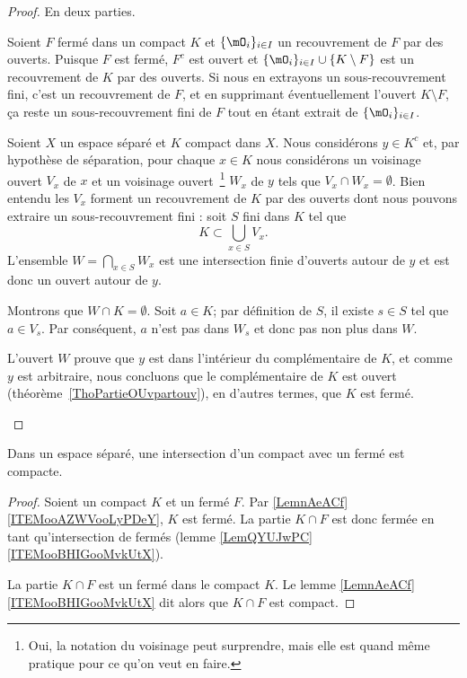 \begin{proof}
	En deux parties.
	\begin{subproof}
		Soient \( F\) fermé dans un compact \( K\) et \( \{ \mO_i \}_{i\in I}\) un recouvrement de \( F\) par des ouverts. Puisque \( F\) est fermé, \( F^c\) est ouvert et \( \{ \mO_i \}_{i\in I}\cup\{ K\setminus F \}\) est un recouvrement de \( K\) par des ouverts. Si nous en extrayons un sous-recouvrement fini, c'est un recouvrement de \( F\), et en supprimant éventuellement l'ouvert \( K\setminus F\), ça reste un sous-recouvrement fini de \( F\) tout en étant extrait de \( \{ \mO_i \}_{i\in I}\).

		Soient \( X\) un espace séparé et \( K\) compact dans \( X\). Nous considérons \( y \in K^c\) et, par hypothèse de séparation, pour chaque \( x\in K\) nous considérons un voisinage ouvert \( V_x\) de \( x\) et un voisinage ouvert~\footnote{Oui, la notation du voisinage peut surprendre, mais elle est quand même pratique pour ce qu'on veut en faire.} \( W_x\) de \( y\) tels que \( V_x\cap W_x=\emptyset\). Bien entendu les \( V_x\) forment un recouvrement de \( K\) par des ouverts dont nous pouvons extraire un sous-recouvrement fini : soit \( S\) fini dans \( K\) tel que
		\begin{equation}
			K\subset\bigcup_{x\in S}V_x.
		\end{equation}
		L'ensemble \( W=\bigcap_{x\in S}W_x\) est une intersection finie d'ouverts autour de \( y\) et est donc un ouvert autour de \( y\).

		Montrons que \( W\cap K=\emptyset\). Soit \( a\in K\); par définition de \( S\), il existe \( s\in S\) tel que \( a\in V_s\). Par conséquent, \( a\) n'est pas dans \( W_s\) et donc pas non plus dans \( W\).

		L'ouvert \( W\) prouve que \( y\) est dans l'intérieur du complémentaire de \( K\), et comme \( y \) est arbitraire, nous concluons que le complémentaire de \( K\) est ouvert (théorème~\ref{ThoPartieOUvpartouv}), en d'autres termes, que \( K\) est fermé.
	\end{subproof}
\end{proof}


\begin{corollary}		\label{CORooSSFFooNkNmlS}
	Dans un espace séparé, une intersection d'un compact avec un fermé est compacte.
\end{corollary}

\begin{proof}
	Soient un compact \( K\) et un fermé \( F\). Par \ref{LemnAeACf}\ref{ITEMooAZWVooLyPDeY}, \( K\) est fermé. La partie \( K\cap F\) est donc fermée en tant qu'intersection de fermés (lemme \ref{LemQYUJwPC}\ref{ITEMooBHIGooMvkUtX}).

	La partie \( K\cap F\) est un fermé dans le compact \( K\). Le lemme \ref{LemnAeACf}\ref{ITEMooBHIGooMvkUtX} dit alors que \( K\cap F\) est compact.
\end{proof}



